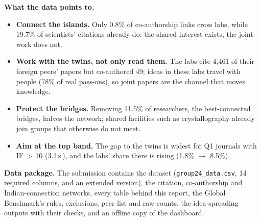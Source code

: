 \documentclass[10pt,a4paper,twocolumn]{article}
\begin{document}
\textbf{What the data points to.}
\begin{itemize}
\item \textbf{Connect the islands.} Only 0.8\% of co-authorship links cross labs, while 19.7\% of scientists' citations already do: the shared interest exists, the joint work does not.
\item \textbf{Work with the twins, not only read them.} The labs cite 4,461 of their foreign peers' papers but co-authored 49; ideas in these labs travel with people (78\% of real pass-ons), so joint papers are the channel that moves knowledge.
\item \textbf{Protect the bridges.} Removing 11.5\% of researchers, the best-connected bridges, halves the network; shared facilities such as crystallography already join groups that otherwise do not meet.
\item \textbf{Aim at the top band.} The gap to the twins is widest for Q1 journals with IF\,$>$\,10 (3.1$\times$), and the labs' share there is rising (1.8\% $\to$ 8.5\%).
\end{itemize}

\textbf{Data package.} The submission contains the dataset (\texttt{group24\_data.csv}, 14 required columns, and an extended version), the citation, co-authorship and Indian-connection networks, every table behind this report, the Global Benchmark's rules, exclusions, peer list and raw counts, the idea-spreading outputs with their checks, and an offline copy of the dashboard.
\end{document}
